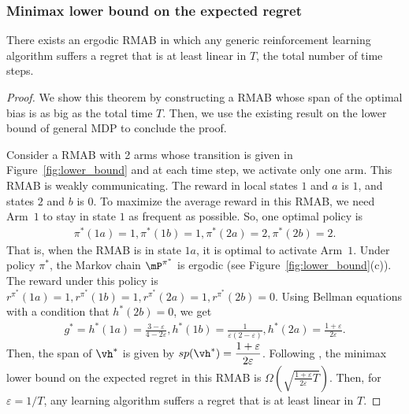 \subsubsection{Minimax lower bound on the expected regret}

\begin{thm}[incomplete]
    There exists an ergodic RMAB in which any generic reinforcement learning algorithm suffers a regret that is at least linear in $T$, the total number of time steps.
\end{thm}
\begin{proof}
    We show this theorem by constructing a RMAB whose span of the optimal bias is as big as the total time $T$.
    Then, we use the existing result on the lower bound of general MDP to conclude the proof.

    Consider a RMAB with 2 arms whose transition is given in Figure~\ref{fig:lower_bound} and at each time step, we activate only one arm.
    This RMAB is weakly communicating.
    The reward in local states $1$ and $a$ is $1$, and states $2$ and $b$ is $0$.
    To maximize the average reward in this RMAB, we need Arm~$1$ to stay in state $1$ as frequent as possible.
    So, one optimal policy is
    \begin{align*}
        \pi^*(1a)=1, \pi^*(1b)=1, \pi^*(2a)=2, \pi^*(2b)=2.
    \end{align*}
    That is, when the RMAB is in state $1a$, it is optimal to activate Arm~$1$.
    Under policy $\pi^*$, the Markov chain $\mP^{\pi^*}$ is ergodic (see Figure~\ref{fig:lower_bound}(c)).
    The reward under this policy is $r^{\pi^*}(1a)=1, r^{\pi^*}(1b)=1, r^{\pi^*}(2a)=1, r^{\pi^*}(2b)=0$.
    Using Bellman equations with a condition that $h^*(2b)=0$, we get
    \begin{align*}
        g^*=h^*(1a)=\frac{3-\varepsilon}{4-2\varepsilon}, h^*(1b)=\frac1{\varepsilon(2-\varepsilon)},
        h^*(2a)=\frac{1+\varepsilon}{2\varepsilon}.
    \end{align*}
    Then, the span of $\vh^*$ is given by $sp(\vh^*)=\displaystyle\frac{1+\varepsilon}{2\varepsilon}$.
    Following \cite{jaksch2010near, zhang2019regret}, the minimax lower bound on the expected regret in this RMAB is $\displaystyle\Omega\left(\sqrt{\frac{1+\varepsilon}{2\varepsilon}T}\right)$.
    Then, for $\varepsilon=1/T$, any learning algorithm suffers a regret that is at least linear in $T$.
    

\end{proof}
